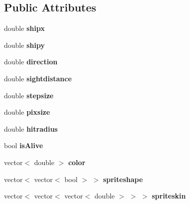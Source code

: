 \subsection*{Public Attributes}
\begin{DoxyCompactItemize}
\item 
\hypertarget{classBadguy_a5b25175842255733ad21172c9e6cc0de}{double {\bfseries shipx}}\label{classBadguy_a5b25175842255733ad21172c9e6cc0de}

\item 
\hypertarget{classBadguy_a8a47ed4203405e2f4b8178786b6cb883}{double {\bfseries shipy}}\label{classBadguy_a8a47ed4203405e2f4b8178786b6cb883}

\item 
\hypertarget{classBadguy_afaddfa335d801e4dccf9ac9af0dd0408}{double {\bfseries direction}}\label{classBadguy_afaddfa335d801e4dccf9ac9af0dd0408}

\item 
\hypertarget{classBadguy_a221b761b3607d2277efdb2484224728a}{double {\bfseries sightdistance}}\label{classBadguy_a221b761b3607d2277efdb2484224728a}

\item 
\hypertarget{classBadguy_ab4d1d68fb96c348faed8caf7433172ef}{double {\bfseries stepsize}}\label{classBadguy_ab4d1d68fb96c348faed8caf7433172ef}

\item 
\hypertarget{classBadguy_a307731a21843c98b6185d2f6f9da97ae}{double {\bfseries pixsize}}\label{classBadguy_a307731a21843c98b6185d2f6f9da97ae}

\item 
\hypertarget{classBadguy_aed3147567f8260693f39dd737d5b82de}{double {\bfseries hitradius}}\label{classBadguy_aed3147567f8260693f39dd737d5b82de}

\item 
\hypertarget{classBadguy_aab6b8f7a3e66f5c4c9acce0199002825}{bool {\bfseries is\-Alive}}\label{classBadguy_aab6b8f7a3e66f5c4c9acce0199002825}

\item 
\hypertarget{classBadguy_ab2a688604b4e8d709f322bcc542e4264}{vector$<$ double $>$ {\bfseries color}}\label{classBadguy_ab2a688604b4e8d709f322bcc542e4264}

\item 
\hypertarget{classBadguy_a465fe0cbdec160eded51497821a6bc43}{vector$<$ vector$<$ bool $>$ $>$ {\bfseries spriteshape}}\label{classBadguy_a465fe0cbdec160eded51497821a6bc43}

\item 
\hypertarget{classBadguy_a5244515f0cfec042cbe6802ebdaf0c9b}{vector$<$ vector$<$ vector$<$ double $>$ $>$ $>$ {\bfseries spriteskin}}\label{classBadguy_a5244515f0cfec042cbe6802ebdaf0c9b}

\end{DoxyCompactItemize}


